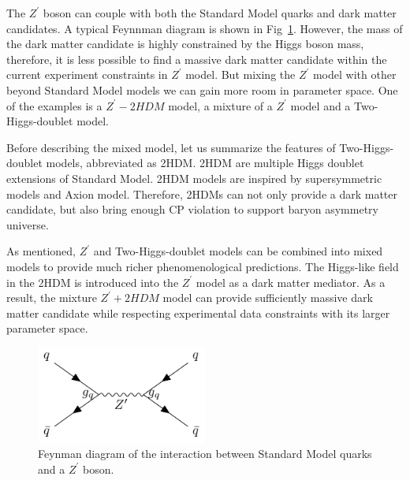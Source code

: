 \par The $Z^\prime$ boson can couple with both the Standard Model quarks and dark matter candidates. A typical Feynnman diagram is shown in Fig~\ref{fig:c2zprime}. However, the mass of the dark matter candidate is highly constrained by the Higgs boson mass, therefore, it is less possible to find a massive dark matter candidate within the current experiment constraints in $Z^{\prime}$ model. But mixing the $Z^{\prime}$ model with other beyond Standard Model models we can gain more room in parameter space. One of the examples is a $Z^{\prime}-2HDM$ model, a mixture of a $Z^{\prime}$ model and a Two-Higgs-doublet model.

\par Before describing the mixed model, let us summarize the features of Two-Higgs-doublet models\cite{Branco:2011iw}, abbreviated as 2HDM. 2HDM are multiple Higgs doublet extensions of Standard Model. 2HDM models are inspired by supersymmetric models\cite{Martin:1997ns} and Axion model\cite{Peccei:2006as}. Therefore, 2HDMs can not only provide a dark matter candidate, but also bring enough CP violation to support baryon asymmetry universe.


\par As mentioned, $Z^{\prime}$ and Two-Higgs-doublet models can be combined into mixed models to provide much richer phenomenological predictions. The Higgs-like field in the 2HDM is introduced into the $Z^{\prime}$ model as a dark matter mediator. As a result, the mixture $Z^{\prime}+2HDM$ model\cite{Berlin:2014cfa} can provide sufficiently massive dark matter candidate while respecting experimental data constraints with its larger parameter space.

\begin{figure}[htbp]
    \centering
    \includegraphics[width=0.5\textwidth]{chapters/c2/figures/z-prime}
    \caption{Feynman diagram of the interaction between Standard Model quarks and a $Z^{\prime}$ boson.}
    \label{fig:c2zprime}
\end{figure}

